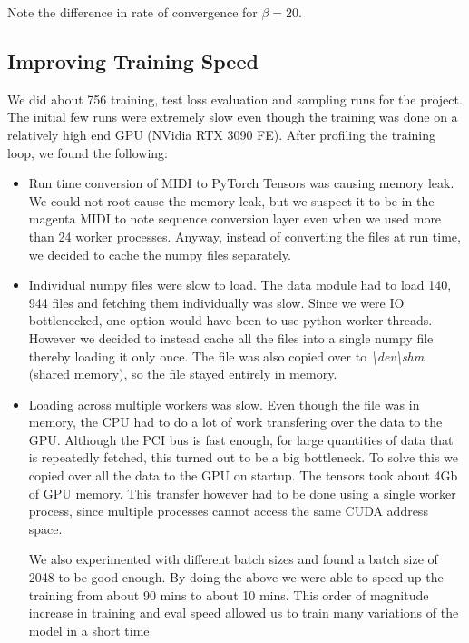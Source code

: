 \documentclass{article}
\begin{document}
Note the difference in rate of convergence for $\beta = 20$.

\subsection{Improving Training Speed}
We did about 756 training, test loss evaluation and sampling runs for the project. The initial few runs were extremely slow even though the training was done on a relatively high end GPU (NVidia RTX 3090 FE). After profiling the training loop, we found the following:

\begin{itemize}
\item Run time conversion of MIDI to PyTorch Tensors was causing memory leak.
We could not root cause the memory leak, but we suspect it to be in the magenta MIDI to note sequence conversion layer even when we used more than 24 worker processes. Anyway, instead of converting the files at run time, we decided to cache the numpy files separately.
\item Individual numpy files were slow to load. The data module had to load 140, 944 files and fetching them individually was slow. Since we were IO bottlenecked, one option would have been to use python worker threads. However we decided to instead cache all the files into a single numpy file thereby loading it only once. The file was also copied over to \textit{\textbackslash dev\textbackslash shm} (shared memory), so the file stayed entirely in memory.
\item Loading across multiple workers was slow. Even though the file was in memory, the CPU had to do a lot of work transfering over the data to the GPU. Although the PCI bus is fast enough, for large quantities of data that is repeatedly fetched, this turned out to be a big bottleneck. To solve this we copied over all the data to the GPU on startup. The tensors took about 4Gb of GPU memory. This transfer however had to be done using a single worker process, since multiple processes cannot access the same CUDA address space.

We also experimented with different batch sizes and found a batch size of 2048 to be good enough. By doing the above we were able to speed up the training from about 90 mins to about 10 mins. This order of magnitude increase in training and eval speed allowed us to train many variations of the model in a short time.

\end{itemize}
\end{document}
